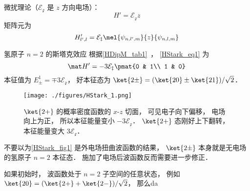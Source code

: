 
\begin{issues}
\issueDraft
\end{issues}


微扰理论（$\mathcal{E_z}$ 是 $z$ 方向电场）：
\begin{equation}
H' = \mathcal{E_z} z
\end{equation}
矩阵元为
\begin{equation}\label{HStark_eq1}
H'_{l',l} = \mathcal{E_z}\mel{\psi_{n,l',m}}{z}{\psi_{n,l,m}}
\end{equation}


\begin{example}{氢原子 $n=2$ 的斯塔克效应}
根据\autoref{HDipM_tab1}~， \autoref{HStark_eq1} 为
\begin{equation}
\mat H' = -3\mathcal{E_z}\pmat{0 & 1\\ 1 & 0}
\end{equation}
本征值为 $E_{\pm}^1 = \mp 3\mathcal{E_z}$， 好本征态为 $\ket{2\pm} = (\ket{20} \pm \ket{21})/{\sqrt 2}$．

\begin{figure}[ht]
\centering
\texttt{[image: ./figures/HStark\_1.png]}
\caption{$\ket{2+}$ 的概率密度函数的 $x$-$z$ 切面， 可见电子向下偏移， 电场向上为正， 所以本征能量变小 $-3\mathcal{E_z}$． $\ket{2+}$ 态刚好上下翻转， 本征能量变大 $3\mathcal{E_z}$．} \label{HStark_fig1}
\end{figure}

不要以为\autoref{HStark_fig1} 是外电场扭曲波函数的结果， $\ket{2\pm}$ 本身就是无电场的氢原子 $n=2$ 本征态． 施加了电场后波函数反而需要进一步修正．

如果初始时， 波函数处于 $n=2$ 子空间的任意状态， 例如 $\ket{20} = (\ket{2+} + \ket{2-})/\sqrt 2$， 那么da
\end{example}
